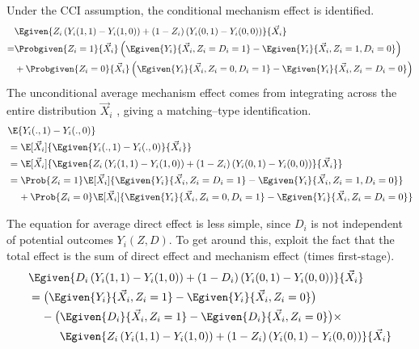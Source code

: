Under the CCI assumption, the conditional mechanism effect is identified.
\begin{align*}
    & \Egiven{ Z_i \left(Y_i(1, 1) - Y_i(1, 0) \right)
    + (1 - Z_i) \left(Y_i(0, 1) - Y_i(0, 0) \right)}{\vec X_i} \\
    =& \Probgiven{Z_i = 1}{\vec X_i} \left(
        \Egiven{ Y_i }{ \vec X_i, Z_i = D_i = 1}
            - \Egiven{ Y_i }{ \vec X_i, Z_i = 1, D_i = 0} \right) \\
    &+ \Probgiven{Z_i = 0}{\vec X_i} \left(
        \Egiven{ Y_i }{ \vec X_i, Z_i = 0, D_i = 1}
            - \Egiven{ Y_i }{ \vec X_i, Z_i = D_i = 0} \right)
\end{align*}
The unconditional average mechanism effect comes from integrating across the entire distribution $\vec X_i$ \citep{frolich2007nonparametric}, giving a matching--type identification.
\begin{align*}
    & \E{ Y_i(., 1) - Y_i(., 0) } \\
    &=\E[\vec X_i]{ \Egiven{ Y_i(., 1) - Y_i(., 0) }{\vec X_i}} \\
    &= \E[\vec X_i]{ \Egiven{ Z_i \left(Y_i(1, 1) - Y_i(1, 0) \right)
    + (1 - Z_i) \left(Y_i(0, 1) - Y_i(0, 0) \right)}{\vec X_i}} \\
    &= \Prob{Z_i = 1} \E[\vec X_i]{
        \Egiven{ Y_i }{ \vec X_i, Z_i = D_i = 1}
            - \Egiven{ Y_i }{ \vec X_i, Z_i = 1, D_i = 0} } \\
    &\;\;\;\; + \Prob{Z_i = 0} \E[\vec X_i]{
        \Egiven{ Y_i }{ \vec X_i, Z_i = 0, D_i = 1}
            - \Egiven{ Y_i }{ \vec X_i, Z_i = D_i = 0}}
\end{align*}

The equation for average direct effect is less simple, since $D_i$ is not independent of potential outcomes $Y_i(Z, D)$.
To get around this, exploit the fact that the total effect is the sum of direct effect and mechanism effect (times first-stage).
\begin{align*}
    & \Egiven{ D_i \left(Y_i(1, 1) - Y_i(1, 0) \right)
    + (1 - D_i) \left(Y_i(0, 1) - Y_i(0, 0) \right)}{\vec X_i} \\
    &= \bigl( \Egiven{Y_i}{\vec X_i, Z_i = 1} -
        \Egiven{Y_i}{\vec X_i, Z_i = 0} \bigr) \\
    & \;\;\;\; -
    \bigl( \Egiven{D_i}{ \vec X_i, Z_i = 1} - \Egiven{D_i}{ \vec X_i, Z_i = 0}
        \bigr) \times \\
    & \;\;\;\; \;\;\;\; \;\;
    \Egiven{ Z_i \left(Y_i(1, 1) - Y_i(1, 0) \right)
            + (1 - Z_i) \left(Y_i(0, 1) - Y_i(0, 0) \right)}{\vec X_i}
\end{align*}

